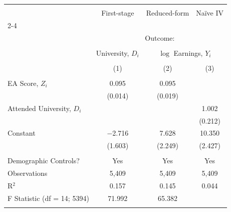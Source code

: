
\begin{tabular}{@{\extracolsep{5pt}}lccc} 
\\[-1.8ex]\hline 
\hline \\[-1.8ex] 
 & First-stage & Reduced-form & Na\"ive IV \\ 
\cline{2-4} 
\\[-1.8ex] & \multicolumn{3}{c}{Outcome:} \\ 
\\[-1.8ex] & University, $D_i$ & \multicolumn{2}{c}{$\log$ Earnings, $Y_i$} \\ 
\\[-1.8ex] & (1) & (2) & (3)\\ 
\hline \\[-1.8ex] 
EA Score, $Z_i$ & 0.095 & 0.095 &  \\ 
  & (0.014) & (0.019) &  \\ 
Attended University, $D_i$ &  &  & 1.002 \\ 
  &  &  & (0.212) \\ 
 Constant & $-$2.716 & 7.628 & 10.350 \\ 
  & (1.603) & (2.249) & (2.427) \\ 
 \hline \\[-1.8ex] 
Demographic Controls? & Yes & Yes & Yes \\ 
Observations & 5,409 & 5,409 & 5,409 \\ 
R$^{2}$ & 0.157 & 0.145 & 0.044 \\ 
F Statistic (df = 14; 5394) & 71.992 & 65.382 &  \\ 
\hline 
\hline \\[-1.8ex] 
\end{tabular} 
